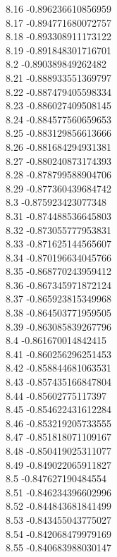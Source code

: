 {8.16	-0.896236610856959\\
8.17	-0.894771680072757\\
8.18	-0.893308911173122\\
8.19	-0.891848301716701\\
8.2	-0.890389849262482\\
8.21	-0.888933551369797\\
8.22	-0.887479405598334\\
8.23	-0.886027409508145\\
8.24	-0.884577560659653\\
8.25	-0.883129856613666\\
8.26	-0.881684294931381\\
8.27	-0.880240873174393\\
8.28	-0.878799588904706\\
8.29	-0.877360439684742\\
8.3	-0.875923423077348\\
8.31	-0.874488536645803\\
8.32	-0.873055777953831\\
8.33	-0.871625144565607\\
8.34	-0.870196634045766\\
8.35	-0.868770243959412\\
8.36	-0.867345971872124\\
8.37	-0.865923815349968\\
8.38	-0.864503771959505\\
8.39	-0.863085839267796\\
8.4	-0.861670014842415\\
8.41	-0.860256296251453\\
8.42	-0.858844681063531\\
8.43	-0.857435166847804\\
8.44	-0.85602775117397\\
8.45	-0.854622431612284\\
8.46	-0.853219205733555\\
8.47	-0.851818071109167\\
8.48	-0.850419025311077\\
8.49	-0.849022065911827\\
8.5	-0.847627190484554\\
8.51	-0.846234396602996\\
8.52	-0.844843681841499\\
8.53	-0.843455043775027\\
8.54	-0.842068479979169\\
8.55	-0.840683988030147\\
}
